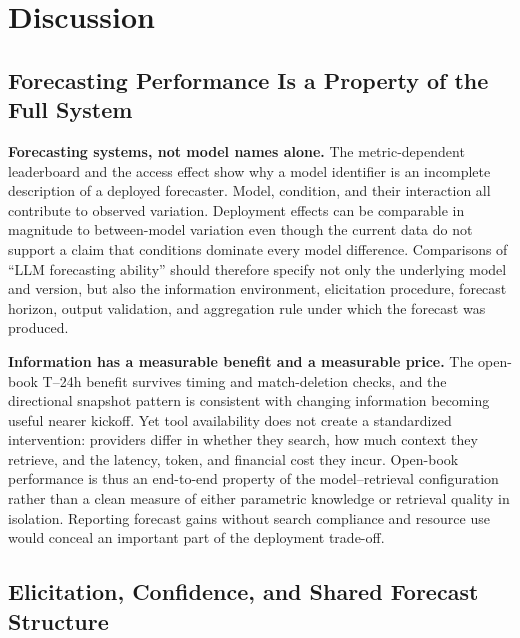 \section{Discussion}
\label{sec:discussion}

\subsection{Forecasting Performance Is a Property of the Full System}
\label{sec:discussion-system}

\begin{draftbullets}
  \item \textbf{Forecasting systems, not model names alone.} The metric-dependent leaderboard and the
  access effect show why a model identifier is an incomplete description of a deployed forecaster.
  Model, condition, and their interaction all contribute to observed variation. Deployment effects
  can be comparable in magnitude to between-model variation even though the current data do not
  support a claim that conditions dominate every model difference. Comparisons of ``LLM forecasting
  ability'' should therefore specify not only the underlying model and version, but also the
  information environment, elicitation procedure, forecast horizon, output validation, and aggregation
  rule under which the forecast was produced.

  \item \textbf{Information has a measurable benefit and a measurable price.} The open-book T--24h
  benefit survives timing and match-deletion checks, and the directional snapshot pattern is
  consistent with changing information becoming useful nearer kickoff. Yet tool availability does
  not create a standardized intervention: providers differ in whether they search, how much context
  they retrieve, and the latency, token, and financial cost they incur. Open-book performance is thus
  an end-to-end property of the model--retrieval configuration rather than a clean measure of either
  parametric knowledge or retrieval quality in isolation. Reporting forecast gains without search
  compliance and resource use would conceal an important part of the deployment trade-off.
\end{draftbullets}

\subsection{Elicitation, Confidence, and Shared Forecast Structure}
\label{sec:discussion-structure}

